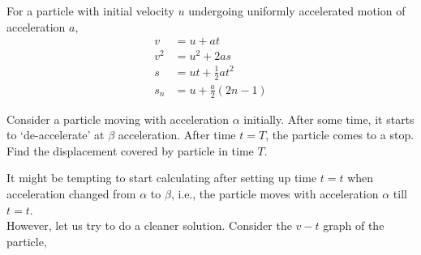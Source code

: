 
\begin{theorem}
    For a particle with initial velocity \(u\) undergoing uniformly accelerated motion of acceleration \(a\),
    \begin{align}
        v &= u + at \\
        v^2 &= u^2 + 2as \\
        s &= ut + \frac{1}{2} at^2 \\
        s_{n} &= u + \frac{a}{2}(2n - 1)
    \end{align}
\end{theorem}



\begin{example}
    Consider a particle moving with acceleration \(\alpha\) initially. After some time, it starts
    to `de-accelerate' at \(\beta\) acceleration. After time \(t = T\), the particle comes to a stop.
    Find the displacement covered by particle in time \(T\).
\begin{soln}
        It might be tempting to start calculating after setting up time \(t = t\) when acceleration
        changed from \(\alpha\) to \(\beta\), i.e., the particle moves with acceleration \(\alpha\) till
        \(t = t\).\\
        However, let us try to do a cleaner solution. Consider the \(v-t\) graph of the particle,

        \begin{figure}
            [H]
        \end{figure}
\end{soln}
\end{example}